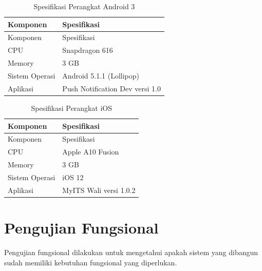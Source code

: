 \begin{longtable}{|p{3cm}|p{6cm}|}
	\caption{Spesifikasi Perangkat Android 3} \label{t:spec-android-3} \\ \hline
	\rowcolor{lightgray} Komponen & Spesifikasi \\ \hline
    \endfirsthead
    \hline
    \rowcolor{lightgray} Komponen & Spesifikasi \\ \hline
    \endhead
    CPU & Snapdragon 616 \\ \hline
    Memory & 3 GB \\ \hline
    Sistem Operasi & Android 5.1.1 (Lollipop) \\ \hline
    Aplikasi & Push Notification Dev versi 1.0 \\ \hline
\end{longtable}
\begin{longtable}{|p{3cm}|p{6cm}|}
	\caption{Spesifikasi Perangkat iOS} \label{t:spec-ios} \\ \hline
	\rowcolor{lightgray} Komponen & Spesifikasi \\ \hline
	\endfirsthead
	\hline
	\rowcolor{lightgray} Komponen & Spesifikasi \\ \hline
	\endhead
    CPU & Apple A10 Fusion \\ \hline
    Memory & 3 GB \\ \hline
    Sistem Operasi & iOS 12 \\ \hline
    Aplikasi & MyITS Wali versi 1.0.2 \\ \hline
\end{longtable}

\section{Pengujian Fungsional}
\par Pengujian fungsional dilakukan untuk mengetahui apakah sistem yang dibangun sudah memiliki kebutuhan fungsional yang diperlukan.


